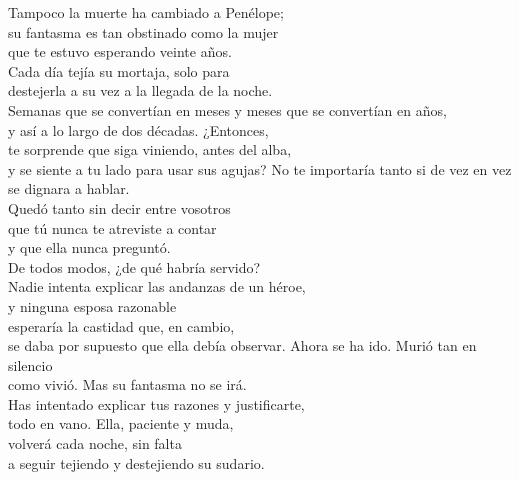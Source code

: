 \begin{versopropio}
Tampoco la muerte ha cambiado a Penélope;\\
su fantasma es tan obstinado como la mujer\\
que te estuvo esperando veinte años.\\
Cada día tejía su mortaja, solo para\\
destejerla a su vez a la llegada de la noche.\\
Semanas que se convertían en meses y meses que se convertían en años,\\
y así a lo largo de dos décadas. ¿Entonces,\\
te sorprende que siga viniendo, antes del alba,\\
y se siente a tu lado para usar sus agujas?
\stanzabreak
No te importaría tanto si de vez en vez\\
se dignara a hablar.\\
Quedó tanto sin decir entre vosotros\\
que tú nunca te atreviste a contar\\
y que ella nunca preguntó.\\
De todos modos, ¿de qué habría servido?\\
Nadie intenta explicar las andanzas de un héroe,\\
y ninguna esposa razonable\\
esperaría la castidad que, en cambio,\\
se daba por supuesto que ella debía observar.
\stanzabreak
Ahora se ha ido. Murió tan en silencio\\
como vivió. Mas su fantasma no se irá.\\
Has intentado explicar tus razones y justificarte,\\
todo en vano. Ella, paciente y muda,\\
volverá cada noche, sin falta\\
a seguir tejiendo y destejiendo su sudario.
\end{versopropio}

